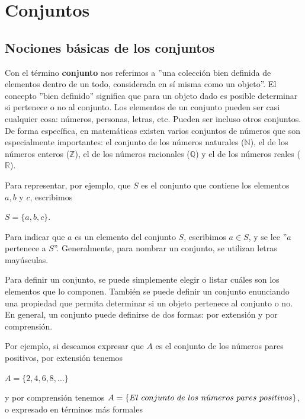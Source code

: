 \documentclass[12pt]{article}
\begin{document}
\section{Conjuntos}

\subsection{Nociones básicas de los conjuntos}

\begin{definicion}
    Con el término \textbf{conjunto} nos referimos a ''una colección bien definida de elementos dentro de un todo, considerada en sí misma como un objeto''. El concepto ''bien definido'' significa que para un objeto dado es posible determinar si pertenece o no al conjunto. Los elementos de un conjunto pueden ser casi cualquier cosa: números, personas, letras, etc. Pueden ser incluso otros conjuntos. De forma específica, en matemáticas existen varios conjuntos de números que son especialmente importantes: el conjunto de los números naturales ($\mathbb{N}$), el de los números enteros ($\mathbb{Z}$), el de los números racionales ($\mathbb{Q}$) y el de los números reales ($\mathbb{R}$).
\end{definicion}

Para representar, por ejemplo, que $S$ es el conjunto que contiene los elementos $a, b$ y $c$, escribimos

\begin{center}
    $S=\{a,b,c\}$.
\end{center}

Para indicar que $a$ es un elemento del conjunto $S$, escribimos $a \in S$, y se lee ''$a$ pertenece a $S$''. Generalmente, para nombrar un conjunto, se utilizan letras mayúsculas.

Para definir un conjunto, se puede simplemente elegir o listar cuáles son los elementos que lo componen. También se puede definir un conjunto enunciando una propiedad que permita determinar si un objeto pertenece al conjunto o no. En general, un conjunto puede definirse de dos formas:  por extensión y por comprensión.

\newpage

Por ejemplo, si deseamos expresar que $A$ es el conjunto de los números pares positivos, por extensión tenemos

\begin{center}
    $A=\{2,4,6,8,...\}$
\end{center}

y por comprensión tenemos $A=\{El \ conjunto \ de \ los \ n\Acute{u}meros \ pares \ positivos\}$, o expresado en términos más formales
\end{document}
